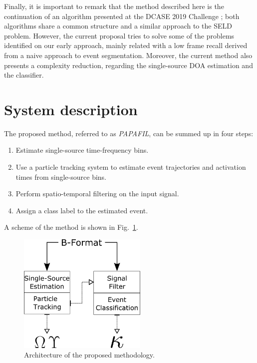 Finally, it is important to remark that the method described here is the continuation of an algorithm presented at the DCASE 2019 Challenge \cite{perez2019hybrid}; both algorithms share a common structure and a similar approach to the SELD problem. 
However, the current proposal tries to solve some of the problems identified on our early approach, mainly related with a low frame recall derived from a naive approach to event segmentation. Moreover, the current method also presents a complexity reduction, regarding the single-source 
DOA estimation and the classifier. 


\section{System description}
\label{sec:methodology}

The proposed method, referred to as \textit{PAPAFIL}, can be summed up in four steps:

\begin{enumerate}
    \item Estimate single-source time-frequency bins.
    \item Use a particle tracking system to estimate event trajectories and activation times from single-source bins.
    \item Perform spatio-temporal filtering on the input signal.
    \item Assign a class label to the estimated event.
\end{enumerate}

A scheme of the method is shown in Fig.~\ref{fig:scheme}.

\begin{figure}[th!]
  \centering
  \centerline{\includegraphics[width=0.55\textwidth]{Figures/SELD/ARCH.png}}
  \caption{Architecture of the proposed methodology.}
  \label{fig:scheme}
\end{figure}


